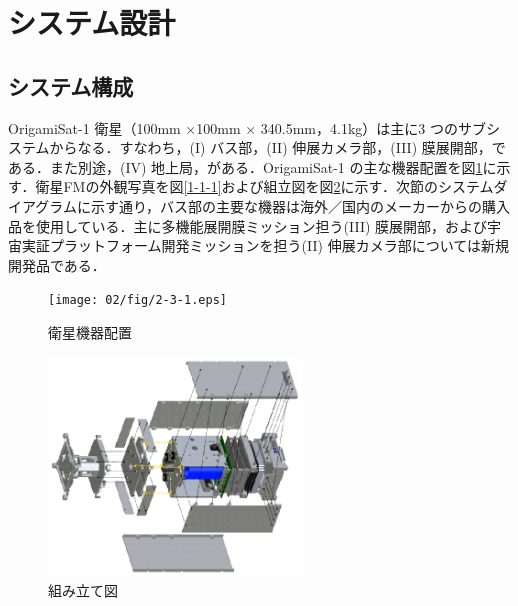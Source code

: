\section{システム設計}

\subsection{システム構成}
OrigamiSat-1 衛星（100mm ×100mm × 340.5mm，4.1kg）は主に3 つのサブシステムからなる．すなわち，(I) バス部，(II) 伸展カメラ部，(III) 膜展開部，である．また別途，(IV) 地上局，がある．OrigamiSat-1 の主な機器配置を図\ref{2-3-1}に示す．衛星FMの外観写真を図\ref{1-1-1}および組立図を図\ref{2-3-2}に示す．次節のシステムダイアグラムに示す通り，バス部の主要な機器は海外／国内のメーカーからの購入品を使用している．主に多機能展開膜ミッション担う(III) 膜展開部，および宇宙実証プラットフォーム開発ミッションを担う(II) 伸展カメラ部については新規開発品である．
\begin{figure}[H]
	\centering
	\texttt{[image: 02/fig/2-3-1.eps]}
	\caption{衛星機器配置}
	\label{2-3-1}
\end{figure}
\begin{figure}[H]
	\centering
	\includegraphics[width=0.6\textwidth]{02/fig/2-3-2.eps}
	\caption{組み立て図}
	\label{2-3-2}
\end{figure}

